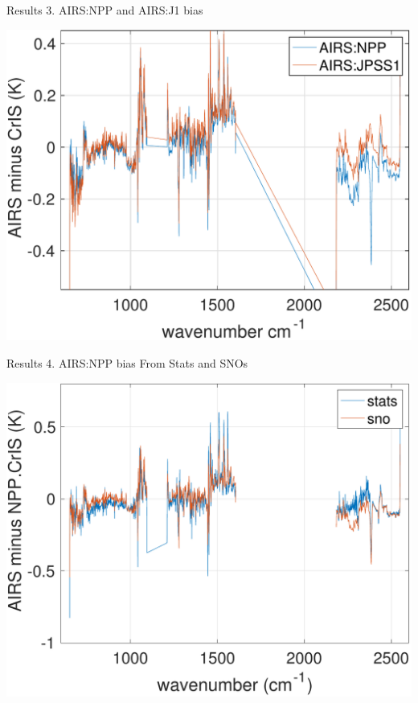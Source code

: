 \documentclass[10pt,t]{beamer}
\begin{document}
\begin{frame}{Results 3. AIRS:NPP and AIRS:J1 bias}

\vspace{-0.1in}
\begin{block}{}
  \begin{center}
    \includegraphics[width=0.6\linewidth]{./Figs/2018d060_2019d059_ac1_ac2_sno_mean_bias.pdf}
  \end{center}
\end{block}
    
\end{frame}

\begin{frame}{Results 4. AIRS:NPP bias From Stats and SNOs}

\vspace{-0.1in}
\begin{block}{}
  \begin{center}
    \includegraphics[width=0.6\linewidth]{./Figs/2018d060_2019d059_airs_npp_ac1_bias_stats_sno.pdf}
  \end{center}
\end{block}
    
\end{frame}
\end{document}
